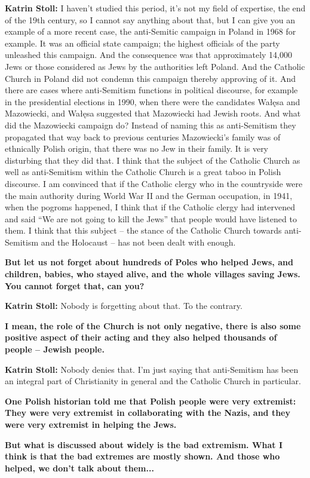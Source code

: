 \textbf{Katrin Stoll:} I haven’t studied this period, it’s not my field of expertise, the end of the 19th century, so I cannot say anything about that, but I can give you an example of a more recent case, the anti-Semitic campaign in Poland in 1968 for example. It was an official state campaign; the highest officials of the party unleashed this campaign. And the consequence was that approximately 14,000 Jews or those considered as Jews by the authorities left Poland. And the Catholic Church in Poland did not condemn this campaign thereby approving of it. And there are cases where anti-Semitism functions in political discourse, for example in the presidential elections in 1990, when there were the candidates Wałęsa and Mazowiecki, and Wałęsa suggested that Mazowiecki had Jewish roots. And what did the Mazowiecki campaign do? Instead of naming this as anti-Semitism they propagated that way back to previous centuries Mazowiecki’s family was of ethnically Polish origin, that there was no Jew in their family. It is very disturbing that they did that. I think that the subject of the Catholic Church as well as anti-Semitism within the Catholic Church is a great taboo in Polish discourse. I am convinced that if the Catholic clergy who in the countryside were the main authority during World War II and the German occupation, in 1941, when the pogroms happened, I think that if the Catholic clergy had intervened and said “We are not going to kill the Jews” that people would have listened to them. I think that this subject – the stance of the Catholic Church towards anti-Semitism and the Holocaust – has not been dealt with enough. 

\textbf{But let us not forget about hundreds of Poles who helped Jews, and children, babies, who stayed alive, and the whole villages saving Jews. You cannot forget that, can you?}

\textbf{Katrin Stoll:} Nobody is forgetting about that. To the contrary.  

\textbf{I mean, the role of the Church is not only negative, there is also some positive aspect of their acting and they also helped thousands of people – Jewish people.} 

\textbf{Katrin Stoll:} Nobody denies that. I’m just saying that anti-Semitism has been an integral part of Christianity in general and the Catholic Church in particular.  

\textbf{One Polish historian told me that Polish people were very extremist: They were very extremist in collaborating with the Nazis, and they were very extremist in helping the Jews.}\par 
\textbf{But what is discussed about widely is the bad extremism. What I think is that the bad extremes are mostly shown. And those who helped, we don’t talk about them...}


